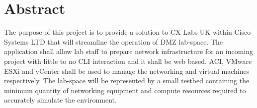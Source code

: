 \section*{Abstract}
The purpose of this project is to provide a solution to CX Labs UK within
  Cisco Systems LTD that will streamline the operation of DMZ lab-space. The
  application shall allow lab staff to prepare network infrastructure for an
  incoming project with little to no CLI interaction and it shall be web based.
  ACI, VMware ESXi and vCenter shall be used to manage the networking and virtual
  machines respectively. The lab-space will be represented by a small testbed
  containing the minimum quantity of networking equipment and compute resources
  required to accurately simulate the environment.
